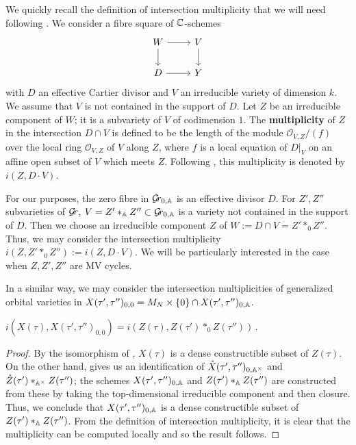 \documentclass{article}
\begin{document}
We quickly recall the definition of intersection multiplicity that we will need following \cite[Example~2.6.5]{fulton2016intersection}. We consider a fibre square of $\CC$-schemes
$$
\begin{tikzcd}
   W\ar[r]\ar[d]&V\ar[d]\\D\ar[r]&Y
\end{tikzcd}
$$
with $D $ an effective Cartier divisor and $V$ an
irreducible variety of dimension $k$. We assume that $V$ is not contained
in the support of $D$. Let $Z$ be an irreducible component of $W$;
it is a subvariety of $V$ of codimension $1$. The \textbf{multiplicity}
of $Z$ in the intersection $D\cap V$ is defined to be the length of the
module $\mathcal O_{V,Z}/(f)$ over the local ring $\mathcal O_{V,Z}$
of $V$ along $Z$, where $f$ is a local equation of $D|_V$ on an affine
open subset of $V$ which meets $Z$. Following \cite[chap.~7]{fulton2016intersection},
this multiplicity is denoted by $i(Z,D\cdot V)$.  

For our purposes, the zero fibre in $\Grbd$ is an effective divisor $D$.   
For $ Z', Z'' $ subvarieties of $ \Gr $, $V = Z'\ast_\AA Z''\subset\Grbd$ is a variety not contained in the support of $D$.  Then we choose an irreducible component $Z$ of $W := D \cap V = Z'\ast_0 Z''$.  Thus, we may consider the intersection multiplicity $ i(Z, Z'\ast_0 Z'') := i(Z, D \cdot V)$.  
We will be particularly interested in the case when $ Z, Z', Z''$ are MV cycles.

In a similar way, we may consider the intersection multiplicities of generalized orbital varieties in $X(\tau', \tau'')_{0,0} = M_N \times \{0\} \cap X(\tau', \tau'')_{0, \AA}$.
\begin{corollary}\label{cor:intmul}
    $i(X(\tau), X(\tau',\tau'')_{0,0}) = i( Z(\tau), Z(\tau')\ast_0 Z(\tau''))\,.$
\end{corollary}

\begin{proof}
By the isomorphism of , $X(\tau) $ is a dense constructible subset of $ Z(\tau) $.  On the other hand,  gives us an identification of $ \mathring X(\tau',\tau'')_{0, \Ax}$ and $ \mathring Z(\tau') \ast_{\Ax} Z(\tau'')$; the schemes $ X(\tau', \tau'')_{0,\AA} $ and $ Z(\tau') \ast_\AA Z(\tau'') $ are constructed from these by taking the top-dimensional irreducible component and then closure.  Thus, we conclude that $ X(\tau', \tau'')_{0,\AA} $ is a dense constructible subset of $ Z(\tau') \ast_\AA Z(\tau'') $.  From the definition of intersection multiplicity, it is clear that the multiplicity can be computed locally and so the result follows.
\end{proof}
% 
\end{document}
